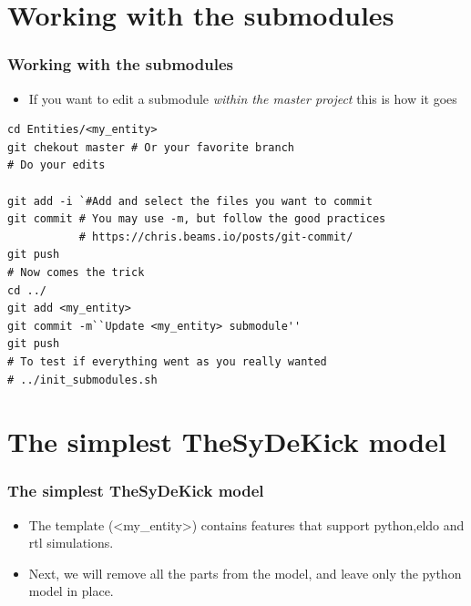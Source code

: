 \documentclass{sdkslides}
\begin{document}
\renewcommand{\sectionname}{Working with the submodules}
\section*{\sectionname}
\begin{frame}[t,fragile]
    \frametitle{\sectionname} 
    \begin{itemize}
        \item If you want to edit a submodule \emph{within the master project}
                this is how it goes
    \end{itemize}
\begin{lstlisting}
cd Entities/<my_entity>
git chekout master # Or your favorite branch
# Do your edits

git add -i `#Add and select the files you want to commit
git commit # You may use -m, but follow the good practices
           # https://chris.beams.io/posts/git-commit/
git push
# Now comes the trick
cd ../
git add <my_entity>
git commit -m``Update <my_entity> submodule''
git push
# To test if everything went as you really wanted
# ../init_submodules.sh
\end{lstlisting}
\end{frame}

\renewcommand{\sectionname}{The simplest TheSyDeKick model}
\section*{\sectionname}
\begin{frame}[t,fragile]
    \frametitle{\sectionname} 
    \begin{itemize}
        \item The template (<my\_entity>) contains features that support
            python,eldo and rtl simulations.
        \item Next, we will remove all the parts from the model, and leave
            only the python model in place.
    \end{itemize}
\end{frame}


\renewcommand{\sectionname}{The target code}
\end{document}
